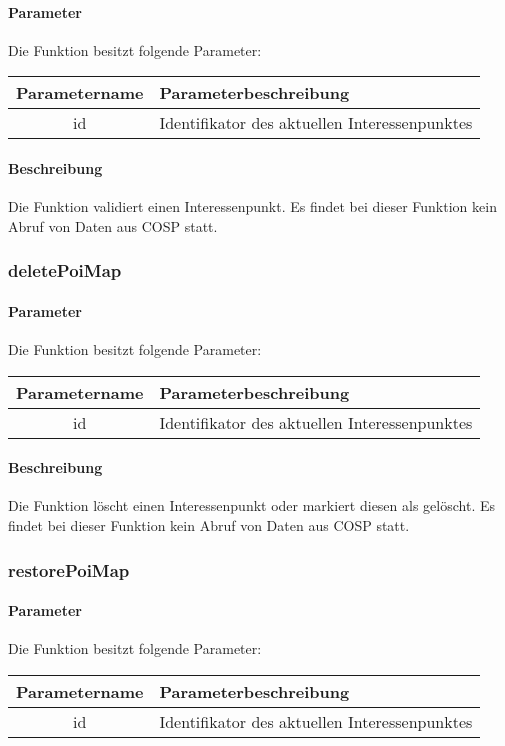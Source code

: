 \paragraph{Parameter} Die Funktion besitzt folgende Parameter:
\begin{table}[H]
	\begin{tabular}{|c|p{11cm}|}
		\hline
		\textbf{Parametername} & \textbf{Parameterbeschreibung} \\ \hline
		id    & Identifikator des aktuellen Interessenpunktes \\ \hline
	\end{tabular}
\end{table}
\paragraph{Beschreibung} Die Funktion validiert einen Interessenpunkt. Es findet bei dieser Funktion kein Abruf von Daten aus {\glqq COSP\grqq} statt.
\subsubsection{deletePoiMap}
\paragraph{Parameter} Die Funktion besitzt folgende Parameter:
\begin{table}[H]
	\begin{tabular}{|c|p{11cm}|}
		\hline
		\textbf{Parametername} & \textbf{Parameterbeschreibung} \\ \hline
		id    & Identifikator des aktuellen Interessenpunktes \\ \hline
	\end{tabular}
\end{table}
\paragraph{Beschreibung} Die Funktion löscht einen Interessenpunkt oder markiert diesen als gelöscht. Es findet bei dieser Funktion kein Abruf von Daten aus {\glqq COSP\grqq} statt.
\subsubsection{restorePoiMap}
\paragraph{Parameter} Die Funktion besitzt folgende Parameter:
\begin{table}[H]
	\begin{tabular}{|c|p{11cm}|}
		\hline
		\textbf{Parametername} & \textbf{Parameterbeschreibung} \\ \hline
		id    & Identifikator des aktuellen Interessenpunktes \\ \hline
	\end{tabular}
\end{table}
